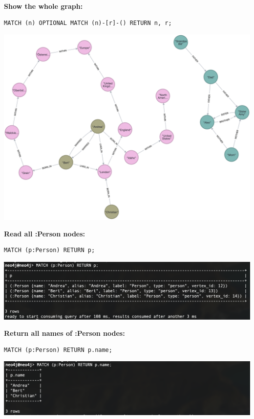 \documentclass[14pt,a4paper]{extarticle}
\begin{document}
	\pagebreak

	\noindent \textbf{Show the whole graph:}
	\begin{lstlisting}[style=sql]
MATCH (n) OPTIONAL MATCH (n)-[r]-() RETURN n, r;
	\end{lstlisting}
	\includegraphics[width=\textwidth]{images/whole graph.png}

	\noindent \textbf{Read all :Person nodes:}
	\begin{lstlisting}[style=sql]
MATCH (p:Person) RETURN p;
	\end{lstlisting}
	\includegraphics[width=\textwidth]{images/sc02.png}

	\pagebreak

	\noindent \textbf{Return all names of :Person nodes:}
	\begin{lstlisting}[style=sql]
MATCH (p:Person) RETURN p.name;
	\end{lstlisting}
	\includegraphics[width=\textwidth]{images/sc03.png}
\end{document}
